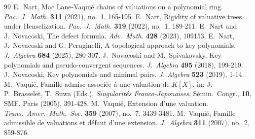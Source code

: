 \documentclass[11pt]{amsart}
\theoremstyle{definition}
\theoremstyle{remark}
\numberwithin{equation}{section}
\begin{document}
\begin{thebibliography}{99}
	 E.\ Nart, Mac Lane-Vaquié chains of valuations on a polynomial ring.  {\it  Pac.\	J.\ Math.} {\bf 311} (2021), no.\ 1, 165-195.
	 E.\ Nart, Rigidity of valuative trees under Henselization.  {\it  Pac.\	J.\ Math.} {\bf 319} (2022), no.\ 1, 189-211.	
	 E.\ Nart and J.\ Novacoski, The defect formula. {\it Adv.\ Math.} {\bf 428} (2023), 109153.
	 E.\ Nart, J.\ Novacoski and G. Peruginelli, A topological approach to key polynomials.  {\it	J.\ Algebra} {\bf 684} (2025), 280-307.
	 J.\ Novacoski and M.\  Spivakovsky,  Key polynomials and pseudo-convergent sequences. {\it J.\  Algebra} {\bf 495} (2018), 199-219.
	 J.\  Novacoski,  Key polynomials and minimal pairs. {\it J.   Algebra} {\bf 523} (2019), 1-14.
 M.\ Vaqui\'e, Famille admise associ\'ee \'a une valuation de $K[X].$ in: J.-P.\ Brasselet, T.\ Suwa (Eds.), {\it Singularit\'es Franco-Japonaises},  S\'emin.\  Congr., {\bf 10},  SMF, Paris (2005), 391-428.
		  M.\ Vaqui\'e,   Extension d'une valuation. {\it Trans.\  Amer.\  Math.\  Soc.} {\bf 359} (2007), no.\  7, 3439-3481.
		  M.\ Vaqui\'e,   Famille admissible de valuations et d\'efaut d'une extension. {\it J.\  Algebra} {\bf 311} (2007), no.\  2, 859-876.
			\end{thebibliography}
\end{document}
